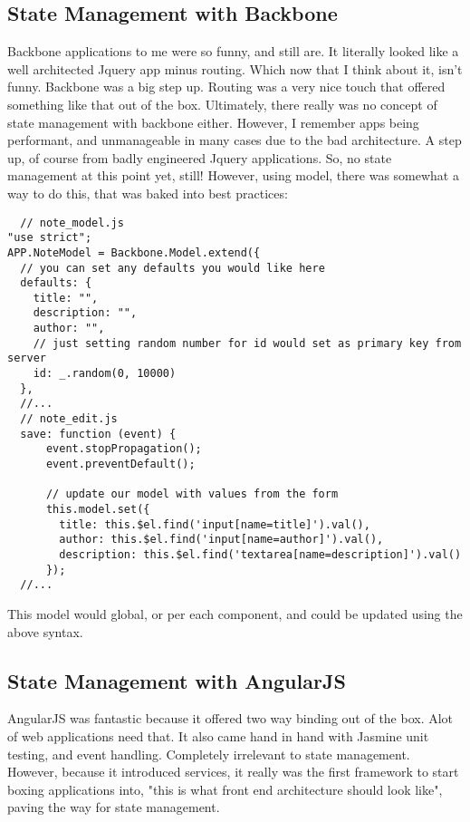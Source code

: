 \subsection{ State Management with Backbone }
Backbone applications to me were so funny, and still are. It literally looked
like a well architected Jquery app minus routing. Which now that I think about
it, isn't funny. Backbone was a big step up. Routing was a very nice touch that
offered something like that out of the box. Ultimately, there really was no
concept of state management with backbone either. However, I remember apps being
performant, and unmanageable in many cases due to the bad architecture. A step
up, of course from badly engineered Jquery applications. So, no state management
at this point yet, still! However, using model, there was somewhat a way to do
this, that was baked into best practices:

\begin{lstlisting}
  // note_model.js
"use strict";
APP.NoteModel = Backbone.Model.extend({
  // you can set any defaults you would like here
  defaults: {
    title: "",
    description: "",
    author: "",
    // just setting random number for id would set as primary key from server
    id: _.random(0, 10000)
  },
  //...
  // note_edit.js
  save: function (event) {
      event.stopPropagation();
      event.preventDefault();

      // update our model with values from the form
      this.model.set({
        title: this.$el.find('input[name=title]').val(),
        author: this.$el.find('input[name=author]').val(),
        description: this.$el.find('textarea[name=description]').val()
      });
  //...

\end{lstlisting}

This model would global, or per each component, and could be updated using the
above syntax.

\subsection{ State Management with AngularJS }
AngularJS was fantastic because it offered two way binding out of the box. Alot
of web applications need that. It also came hand in hand with Jasmine unit
testing, and event handling. Completely irrelevant to state management. However,
because it introduced services, it really was the first framework to start boxing
applications into, "this is what front end architecture should look like",
paving the way for state management.

